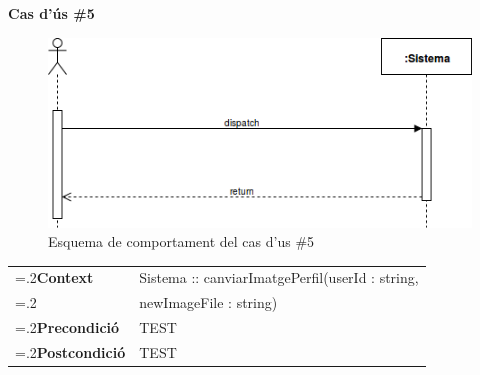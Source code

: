 \clearpage
\noindent\textbf{\large Cas d'ús \#5}\\
\begin{figure}[H]
\centering
\includegraphics[scale=0.6]{Figures/casdus_00.png}
\caption{Esquema de comportament del cas d'us \#5}
\end{figure}
\begin{table}[h]
\noindent
\begin{tabularx}{\linewidth}{
>{\hsize=.2\hsize}X%
>{\hsize=0.8\hsize}X%
}
\textbf{Context} 		& Sistema :: canviarImatgePerfil(userId : string, \\
						& newImageFile : string) \\
\textbf{Precondició} 	& TEST \\
\textbf{Postcondició}	& TEST \\
\end{tabularx}
\label{}
\end{table}

